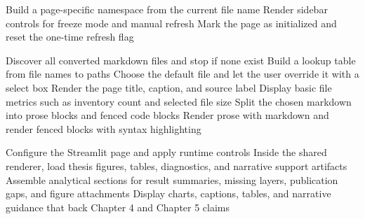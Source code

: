 
\SetAlgoLined
\DontPrintSemicolon
{}

\begin{algorithm}[H]
Build a page-specific namespace from the current file name\;
Render sidebar controls for freeze mode and manual refresh\;
Mark the page as initialized and reset the one-time refresh flag\;
\caption{Runtime Controls for Heavy Streamlit Pages}
\label{alg:runtime-controls}
\end{algorithm}

\begin{algorithm}[H]
Discover all converted markdown files and stop if none exist\;
Build a lookup table from file names to paths\;
Choose the default file and let the user override it with a select box\;
Render the page title, caption, and source label\;
Display basic file metrics such as inventory count and selected file size\;
Split the chosen markdown into prose blocks and fenced code blocks\;
Render prose with markdown and render fenced blocks with syntax highlighting\;
\caption{Converted Markdown Renderer and Thin Wrapper Pages}
\label{alg:converted-markdown-renderer}
\end{algorithm}

\begin{algorithm}[H]
Configure the Streamlit page and apply runtime controls\;
Inside the shared renderer, load thesis figures, tables, diagnostics, and narrative support artifacts\;
Assemble analytical sections for result summaries, missing layers, publication gaps, and figure attachments\;
Display charts, captions, tables, and narrative guidance that back Chapter 4 and Chapter 5 claims\;
\caption{Shared Chapter 4 Results Visualizer}
\label{alg:chapter4-shared-renderer}
\end{algorithm}

